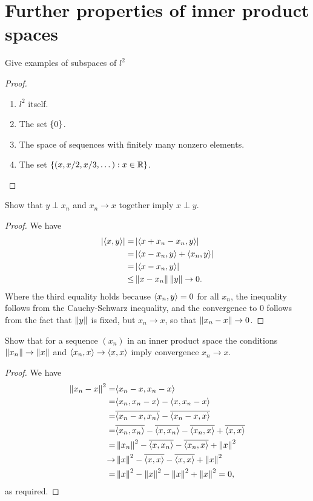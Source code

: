 \section{Further properties of inner product spaces}


\begin{exercise}{2}
Give examples of subspaces of $l^2$
\end{exercise}
\begin{proof}
\begin{enumerate}
    \item $l^2$ itself.
    \item The set $\{0\}$.
    \item The space of sequences with finitely many nonzero elements.
    \item The set $\{(x,x/2,x/3,\dots): x\in\mathbb{R}\}$.
\end{enumerate}
\end{proof}

\begin{exercise}{4}
Show that $y\perp x_n$ and $x_n\to x$ together imply $x\perp y$.
\end{exercise}
\begin{proof}
We have
\begin{align*}
    \left\lvert \langle x,y\rangle\right\rvert
    =& \left\lvert \langle x+x_n-x_n,y\rangle\right\rvert\\
    =& \left\lvert \langle x-x_n,y\rangle + \langle x_n,y\rangle\right\rvert\\
    =& \left\lvert \langle x-x_n,y\rangle\right\rvert\\
    \leq& \left\lVert x-x_n\right\rVert\left\lVert y\right\rVert\to 0.
\end{align*}
Where the third equality holds because $\langle x_n,y\rangle=0$ for all $x_n$, the inequality follows from the Cauchy-Schwarz inequality, and the convergence to 0 follows from the fact that $\left\lVert y\right\rVert$ is fixed, but $x_n\to x$, so that $\left\lVert x_n-x\right\rVert\to 0$.
\end{proof}

\begin{exercise}{5}
Show that for a sequence $(x_n)$ in an inner product space the conditions $\left\lVert x_n\right\rVert\to\left\lVert x\right\rVert$ and $\langle x_n,x\rangle\to\langle x,x\rangle$ imply convergence $x_n\to x$.
\end{exercise}
\begin{proof}
We have
\begin{align*}
    \left\lVert x_n-x\right\rVert^2
    =& \langle x_n-x, x_n-x\rangle\\
    =& \langle x_n,x_n-x\rangle - \langle x,x_n-x\rangle\\
    =& \overline{\langle x_n-x,x_n\rangle} - \overline{\langle x_n-x,x\rangle}\\
    =& \overline{\langle x_n,x_n\rangle} -\overline{\langle x,x_n\rangle} - \overline{\langle x_n,x\rangle} + \overline{\langle x,x\rangle}\\
    =& \left\lVert x_n\right\rVert^2 -\overline{\langle x,x_n\rangle} - \overline{\langle x_n,x\rangle} + \left\lVert x\right\rVert^2\\
    \to& \left\lVert x\right\rVert^2 -\overline{\langle x,x\rangle} - \overline{\langle x,x\rangle} + \left\lVert x\right\rVert^2\\
    =& \left\lVert x\right\rVert^2 - \left\lVert x\right\rVert^2 - \left\lVert x\right\rVert^2 + \left\lVert x\right\rVert^2 = 0,
\end{align*}
as required.
\end{proof}

